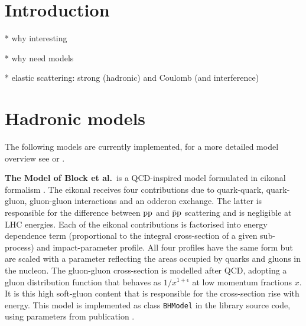 \documentclass[preprint,12pt]{elsarticle}
\def\class#1{{\tt #1}}
\begin{document}
\newpage


\section{Introduction}\label{s:inc}

* why interesting

* why need models

* elastic scattering: strong (hadronic) and Coulomb (and interference)



\section{Hadronic models}\label{s:had mod}

The following models are currently implemented, for a more detailed model overview see \cite[section 1.1]{jan_thesis} or \cite[section 4]{dremin13}.

{\bf The Model of Block et al.}~is a QCD-inspired model formulated in eikonal formalism \cite{bh99,block06}. The eikonal receives four contributions due to quark-quark, quark-gluon, gluon-gluon interactions and an odderon exchange. The latter is responsible for the difference between $\rm pp$ and $\rm \bar p p$ scattering and is negligible at LHC energies. Each of the eikonal contributions is factorised into energy dependence term (proportional to the integral cross-section of a given sub-process) and impact-parameter profile. All four profiles have the same form but are scaled with a parameter reflecting the areas occupied by quarks and gluons in the nucleon. The gluon-gluon cross-section is modelled after QCD, adopting a gluon distribution function that behaves as $1/x^{1+\epsilon}$ at low momentum fractions $x$. It is this high soft-gluon content that is responsible for the cross-section rise with energy. This model is implemented as class \class{BHModel} in the library source code, using parameters from publication \cite{block06}.
\end{document}
